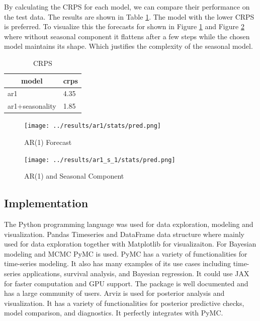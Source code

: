\documentclass{IEEEtran}
\begin{document}
By calculating the CRPS for each model, we can compare their performance on the test data. The results are shown in Table \ref{tab:crps}. The model with the lower CRPS is preferred. To visualize this the forecasts for shown in Figure \ref{fig:ar1_pred} and Figure \ref{fig:ar1_s_pred} where without seasonal component it flattens after a few steps while the chosen model maintains its shape. Which justifies the complexity of the seasonal model.

\begin{table}
  \caption{CRPS}\label{tab:crps}
  \begin{center}
    \begin{tabular}[c]{l|l}
      \hline
      \multicolumn{1}{c|}{\textbf{model}} & 
      \multicolumn{1}{c}{\textbf{crps}} \\
      \hline
      ar1 & 4.35 \\
      ar1+seasonality & 1.85 \\
      \hline
    \end{tabular}
  \end{center}
\end{table}
\begin{figure}
  \begin{center}
    \texttt{[image: ../results/ar1/stats/pred.png]}
  \end{center}
  \caption{AR(1) Forecast}\label{fig:ar1_pred}
\end{figure}
\begin{figure}
  \begin{center}
    \texttt{[image: ../results/ar1\_s\_1/stats/pred.png]}
  \end{center}
  \caption{AR(1) and Seasonal Component}\label{fig:ar1_s_pred}
\end{figure}
\subsection{Implementation}
The Python programming language was used for data exploration, modeling and visualization. Pandas Timeseries and DataFrame data structure where mainly used for data exploration together with Matplotlib for visualizaiton. For Bayesian modeling and MCMC PyMC \cite{pymc} is used. PyMC has a variety of functionalities for time-series modeling. It also has many examples of its use cases including time-series applications, survival analysis, and Bayesian regression. It could use JAX for faster computation and GPU support. The package is well documented and has a large community of users. Arviz \cite{arviz} is used for posterior analysis and visualization. It has a variety of functionalities for posterior predictive checks, model comparison, and diagnostics. It perfectly integrates with PyMC.
\end{document}
